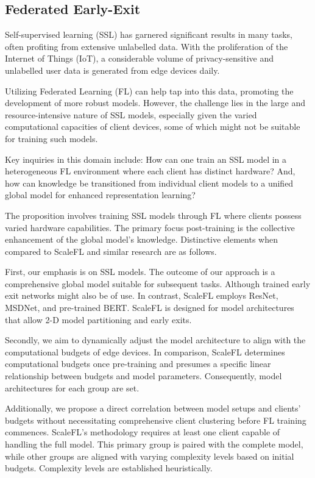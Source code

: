 \documentclass[withindex,glossary,firstyr]{cam-thesis}
\begin{document}
\subsection{Federated Early-Exit}

Self-supervised learning (SSL) has garnered significant results in many tasks, often profiting from extensive unlabelled data. With the proliferation of the Internet of Things (IoT), a considerable volume of privacy-sensitive and unlabelled user data is generated from edge devices daily.

Utilizing Federated Learning (FL) can help tap into this data, promoting the development of more robust models. However, the challenge lies in the large and resource-intensive nature of SSL models, especially given the varied computational capacities of client devices, some of which might not be suitable for training such models.

Key inquiries in this domain include: How can one train an SSL model in a heterogeneous FL environment where each client has distinct hardware? And, how can knowledge be transitioned from individual client models to a unified global model for enhanced representation learning?

The proposition involves training SSL models through FL where clients possess varied hardware capabilities. The primary focus post-training is the collective enhancement of the global model's knowledge. Distinctive elements when compared to ScaleFL and similar research are as follows.

First, our emphasis is on SSL models. The outcome of our approach is a comprehensive global model suitable for subsequent tasks. Although trained early exit networks might also be of use. In contrast, ScaleFL employs ResNet, MSDNet, and pre-trained BERT. ScaleFL is designed for model architectures that allow 2-D model partitioning and early exits.

Secondly, we aim to dynamically adjust the model architecture to align with the computational budgets of edge devices. In comparison, ScaleFL determines computational budgets once pre-training and presumes a specific linear relationship between budgets and model parameters. Consequently, model architectures for each group are set.

Additionally, we propose a direct correlation between model setups and clients' budgets without necessitating comprehensive client clustering before FL training commences. ScaleFL's methodology requires at least one client capable of handling the full model. This primary group is paired with the complete model, while other groups are aligned with varying complexity levels based on initial budgets. Complexity levels are established heuristically.
\end{document}
